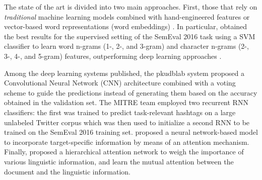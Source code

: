 \documentclass[10pt, a4paper]{article}
\begin{document}

The state of the art is divided into two main approaches. First, those that rely on \emph{traditional} machine learning models combined with hand-engineered features \cite{Mohammad:2017:SST:3106680.3003433} or vector-based word representations (word embeddings) \cite{bohler-etal-2016-idi}. In particular, \cite{Mohammad:2017:SST:3106680.3003433} obtained the best results for the supervised setting of the SemEval 2016 task using a SVM classifier to learn word n-grams (1-, 2-, and 3-gram) and character n-grams (2-, 3-, 4-, and 5-gram) features, outperforming deep learning approaches \cite{zarrella-marsh-2016-mitre,wei-etal-2016-pkudblab}.

Among the deep learning systems published, the pkudblab system \cite{wei-etal-2016-pkudblab} proposed a Convolutional Neural Network (CNN) architecture combined with a voting scheme to guide the predictions instead of generating them based on the accuracy obtained in the validation set. The MITRE team \cite{zarrella-marsh-2016-mitre} employed two recurrent RNN classifiers: the first was trained to predict task-relevant hashtags on a large unlabeled Twitter corpus which was then used to initialize a second RNN to be trained on the SemEval 2016 training set. \cite{du2017stance} proposed a neural network-based model to incorporate target-specific information by means of an attention mechanism. Finally, \cite{sun-etal-2018-stance} proposed a hierarchical attention network to weigh the importance of various linguistic information, and learn the mutual attention between the document and the linguistic information.
\end{document}

